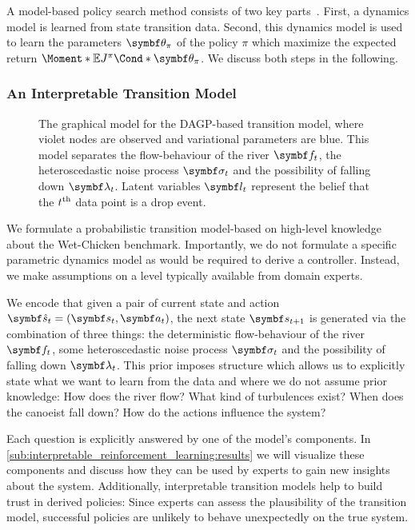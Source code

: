 A model-based policy search method consists of two key parts~\parencite{deisenroth_pilco_2011}.
First, a dynamics model is learned from state transition data.
Second, this dynamics model is used to learn the parameters $\mat{\theta}_\pi$ of the policy $\pi$ which maximize the expected return $\Moment*{\E}{\Fun*{J^\pi}{\mat{\theta}_\pi}}$.
We discuss both steps in the following.


\subsubsection{An Interpretable Transition Model}
\label{sub:interpretable_reinforcement_learning:mdgp}
\begin{figure}[t]
    \centering
    
    \caption{
        \label{fig:interpretable_reinforcement_learning:graphical_model:mdgp}
        The graphical model for the DAGP-based transition model, where violet nodes are observed and variational parameters are blue.
        This model separates the flow-behaviour of the river $\mat{f}_t$, the heteroscedastic noise process $\mat{\sigma}_t$ and the possibility of falling down $\mat{\lambda}_t$.
        Latent variables $\mat{l}_t$ represent the belief that the $t^{\text{th}}$ data point is a drop event.
    }
\end{figure}
We formulate a probabilistic transition model-based on high-level knowledge about the Wet-Chicken benchmark.
Importantly, we do not formulate a specific parametric dynamics model as would be required to derive a controller.
Instead, we make assumptions on a level typically available from domain experts.

We encode that given a pair of current state and action $\mat{\hat{s}}_t = \left( \mat{s}_t, \mat{a}_t \right)$, the next state $\mat{s}_{t+1}$ is generated via the combination of three things:
the deterministic flow-behaviour of the river $\mat{f}_t$, some heteroscedastic noise process $\mat{\sigma}_t$ and the possibility of falling down $\mat{\lambda}_t$.
This prior imposes structure which allows us to explicitly state what we want to learn from the data and where we do not assume prior knowledge:
How does the river flow?
What kind of turbulences exist?
When does the canoeist fall down?
How do the actions influence the system?

Each question is explicitly answered by one of the model's components.
In \cref{sub:interpretable_reinforcement_learning:results} we will visualize these components and discuss how they can be used by experts to gain new insights about the system.
Additionally, interpretable transition models help to build trust in derived policies:
Since experts can assess the plausibility of the transition model, successful policies are unlikely to behave unexpectedly on the true system.

